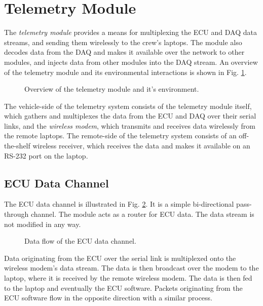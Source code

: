 \section{Telemetry Module\label{sec:Telemetry-Module-Design}}

The \emph{telemetry module} provides a means for multiplexing the ECU and DAQ data streams, and sending them wirelessly to the crew's laptops. The module also decodes data from the DAQ and makes it available over the network to other modules, and injects data from other modules into the DAQ stream. An overview of the telemetry module and its environmental interactions is shown in Fig. \ref{fig:design_telemetry_overview_block}.

\begin{figure}[H]
	\centering
	
	\caption{Overview of the telemetry module and it's environment.}
	\label{fig:design_telemetry_overview_block}
\end{figure}

The vehicle-side of the telemetry system consists of the telemetry module itself, which gathers and multiplexes the data from the ECU and DAQ over their serial links, and the \emph{wireless modem}, which transmits and receives data wirelessly from the remote laptops. The remote-side of the telemetry system consists of an off-the-shelf wireless receiver, which receives the data and makes it available on an RS-232 port on the laptop.

\subsection{ECU Data Channel}

The ECU data channel is illustrated in Fig. \ref{fig:ecu_data_channel}. It is a simple bi-directional pass-through channel. The module acts as a router for ECU data. The data stream is not modified in any way. 

\begin{figure}[H]
	\centering
	
	\caption{Data flow of the ECU data channel.}
	\label{fig:ecu_data_channel}
\end{figure}

Data originating from the ECU over the serial link is multiplexed onto the wireless modem's data stream. The data is then broadcast over the modem to the laptop, where it is received by the remote wireless modem. The data is then fed to the laptop and eventually the ECU software. Packets originating from the ECU software flow in the opposite direction with a similar process.

